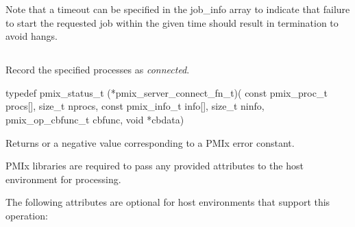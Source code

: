 Note that a timeout can be specified in the job_info array to indicate that failure to start the requested job within the given time should result in termination to avoid hangs.


\subsection{}

\summary

Record the specified processes as \textit{connected}.

\format

\cspecificstart
\begin{codepar}
typedef pmix_status_t (*pmix_server_connect_fn_t)(
                             const pmix_proc_t procs[],
                             size_t nprocs,
                             const pmix_info_t info[],
                             size_t ninfo,
                             pmix_op_cbfunc_t cbfunc,
                             void *cbdata)
\end{codepar}
\cspecificend

\begin{arglist}
\end{arglist}

Returns  or a negative value corresponding to a \ac{PMIx} error constant.

\reqattrstart
\ac{PMIx} libraries are required to pass any provided attributes to the host environment for processing.
\reqattrend

\optattrstart
The following attributes are optional for host environments that support this operation:


\optattrend

\descr

